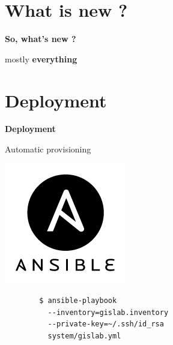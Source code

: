 \documentclass[12pt]{beamer}
\begin{document}
\section{What is new ?}
\begin{frame}
	\begin{center}
		\LARGE\textbf{So, what's new ?}	
	\end{center}
\end{frame}

\begin{frame}
	\begin{center}
		mostly \textbf{everything}
	\end{center}
\end{frame}


\section{Deployment}
\begin{frame}
	\begin{center}
		\LARGE\textbf{Deployment}	
	\end{center}
\end{frame}

\begin{frame}[fragile]{Automatic provisioning}
	\begin{center}
		\includegraphics[keepaspectratio=true,height=0.4\textheight]{images/ansible.png}
	\end{center}

   \lstset{language=sh}
	\begin{lstlisting}
		$ ansible-playbook
		  --inventory=gislab.inventory
		  --private-key=~/.ssh/id_rsa
		  system/gislab.yml
	\end{lstlisting}
\end{frame}
\end{document}
